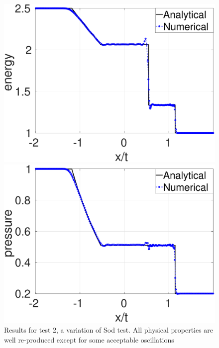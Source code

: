 \begin{figure}
\begin{minipage}{.495\textwidth}
        \includegraphics[width=0.99 \textwidth]{Chapter-4/Figures/GSPH-Sod/GRod-RCM-e}
    \end{minipage}%
    \begin{minipage}{.495 \textwidth}
        \centering
        \includegraphics[width=0.99 \textwidth]{Chapter-4/Figures/GSPH-Sod/GRod-RCM-p}
    \end{minipage}%
    \caption{Results for test 2, a variation of Sod test. All physical properties are well re-produced except for some acceptable oscillations}
    \label{fig:RCM-GSPH-Sod}
\end{figure}

